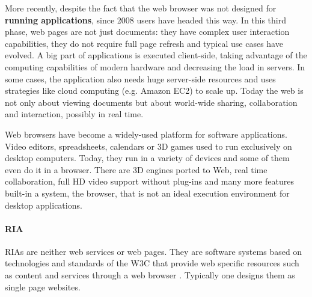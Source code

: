 More recently, despite the fact that the web browser was not designed for \textbf{running applications}, since 2008 users have headed this way. 
In this third phase, web pages are not just documents: they have complex user interaction capabilities, they do not require full page refresh and typical use cases have evolved. 
A big part of applications is executed client-side, taking advantage of the computing capabilities of modern hardware and decreasing the load in servers. 
In some cases, the application also needs huge server-side resources and uses strategies like cloud computing (e.g. Amazon EC2) to scale up.
Today the web is not only about viewing documents but about world-wide sharing, collaboration and interaction, possibly in real time. 

Web browsers have become a widely-used platform for software applications. 
Video editors, spreadsheets, calendars or 3D games used to run exclusively on desktop computers. 
Today, they run in a variety of devices and some of them even do it in a browser. 
There are 3D engines ported to Web, real time collaboration, full HD video support without plug-ins and many more features built-in a system, the browser, that is not an ideal execution environment for desktop applications.

\paragraph{\ac{RIA}}
\acp{RIA} are neither web services or web pages. 
They are software systems based on technologies and standards of the \ac{W3C} that provide web specific resources such as content and services through a web browser \cite{Kappel:2006}.
Typically one designs them as single page websites.

